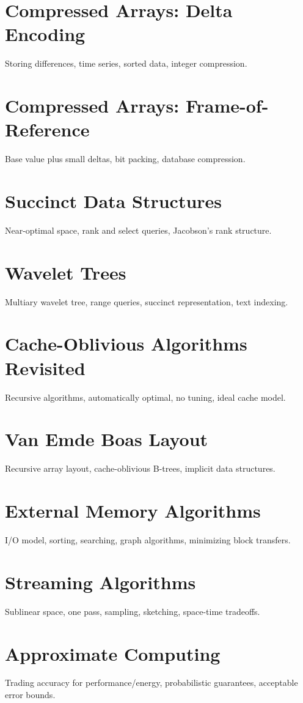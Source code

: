 \chapter{Compressed Arrays: Delta Encoding}
Storing differences, time series, sorted data, integer compression.

\chapter{Compressed Arrays: Frame-of-Reference}
Base value plus small deltas, bit packing, database compression.

\chapter{Succinct Data Structures}
Near-optimal space, rank and select queries, Jacobson's rank structure.

\chapter{Wavelet Trees}
Multiary wavelet tree, range queries, succinct representation, text indexing.

\chapter{Cache-Oblivious Algorithms Revisited}
Recursive algorithms, automatically optimal, no tuning, ideal cache model.

\chapter{Van Emde Boas Layout}
Recursive array layout, cache-oblivious B-trees, implicit data structures.

\chapter{External Memory Algorithms}
I/O model, sorting, searching, graph algorithms, minimizing block transfers.

\chapter{Streaming Algorithms}
Sublinear space, one pass, sampling, sketching, space-time tradeoffs.

\chapter{Approximate Computing}
Trading accuracy for performance/energy, probabilistic guarantees, acceptable error bounds.

